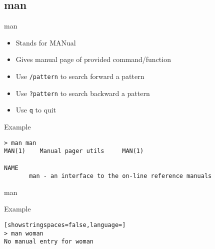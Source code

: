 \subsection{man}

\begin{frame}[fragile]{man}
  \begin{itemize}
    \pause \item Stands for MANual
    \pause \item Gives manual page of provided command/function
    \pause \item Use \texttt{/pattern} to search forward a pattern
    \pause \item Use \texttt{?pattern} to search backward a pattern
    \pause \item Use \texttt{q} to quit
  \end{itemize}
  \pause

  \begin{exampleblock}{Example}
    \begin{lstlisting}[showstringspaces=false,basicstyle=\tiny]
> man man
MAN(1)    Manual pager utils     MAN(1)

NAME
       man - an interface to the on-line reference manuals
    \end{lstlisting}
  \end{exampleblock}
\end{frame}

\begin{frame}[fragile]{man}
  \begin{exampleblock}{Example}
    \begin{lstlisting}[showstringspaces=false,language=]
> man woman
No manual entry for woman
    \end{lstlisting}
  \end{exampleblock}
\end{frame}
